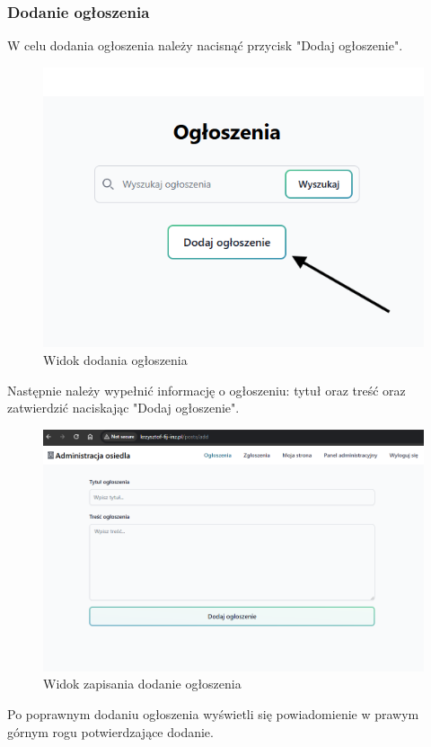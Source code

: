 \subsubsection{Dodanie ogłoszenia}
W celu dodania ogłoszenia należy nacisnąć przycisk "Dodaj ogłoszenie".
\begin{figure}[H]
    \centering
    \includegraphics[width=0.75\linewidth]{img/add_post_button2.png}
    \caption{Widok dodania ogłoszenia}
    \label{fig:add-post}
\end{figure}
Następnie należy wypełnić informację o ogłoszeniu: tytuł oraz treść oraz zatwierdzić naciskając "Dodaj ogłoszenie".
\begin{figure}[H]
    \centering
    \includegraphics[width=0.75\linewidth]{img/post_add.png}
    \caption{Widok zapisania dodanie ogłoszenia}
    \label{fig:post-add}
\end{figure}
Po poprawnym dodaniu ogłoszenia wyświetli się powiadomienie w prawym górnym rogu potwierdzające dodanie.
